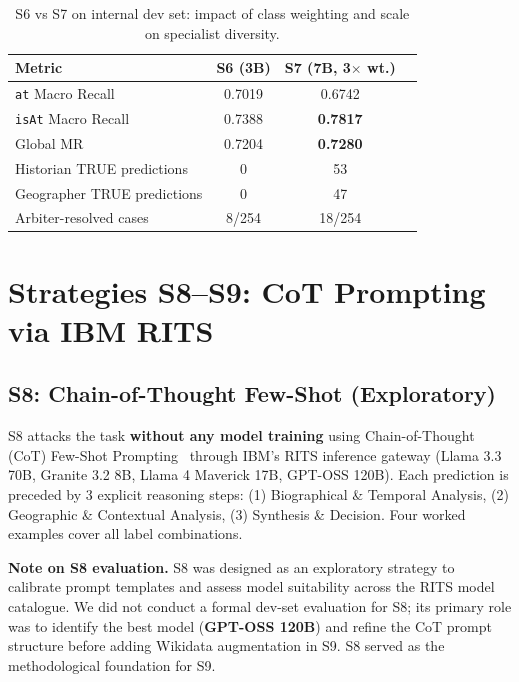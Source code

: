 \documentclass{ceurart}
\begin{document}
\begin{table}[ht]
  \caption{S6 vs S7 on internal dev set: impact of class weighting and scale on specialist diversity.}
  \label{tab:s7}
  \centering
  \begin{tabular}{lccc}
    \toprule
    \textbf{Metric} & \textbf{S6 (3B)} & \textbf{S7 (7B, 3$\times$ wt.)} \\
    \midrule
    \texttt{at} Macro Recall & 0.7019 & 0.6742 \\
    \texttt{isAt} Macro Recall & 0.7388 & \textbf{0.7817} \\
    Global MR & 0.7204 & \textbf{0.7280} \\
    Historian TRUE predictions & 0 & 53 \\
    Geographer TRUE predictions & 0 & 47 \\
    Arbiter-resolved cases & 8/254 & 18/254 \\
    \bottomrule
  \end{tabular}
\end{table}

\section{Strategies S8--S9: CoT Prompting via IBM RITS}
\label{sec:s89}

\subsection{S8: Chain-of-Thought Few-Shot (Exploratory)}

S8 attacks the task \textbf{without any model training} using Chain-of-Thought (CoT) Few-Shot Prompting~\cite{wei2022cot} through IBM's RITS inference gateway (Llama 3.3 70B, Granite 3.2 8B, Llama 4 Maverick 17B, GPT-OSS 120B). Each prediction is preceded by 3 explicit reasoning steps: (1) Biographical \& Temporal Analysis, (2) Geographic \& Contextual Analysis, (3) Synthesis \& Decision. Four worked examples cover all label combinations.

\textbf{Note on S8 evaluation.} S8 was designed as an exploratory strategy to calibrate prompt templates and assess model suitability across the RITS model catalogue. We did not conduct a formal dev-set evaluation for S8; its primary role was to identify the best model (\textbf{GPT-OSS 120B}) and refine the CoT prompt structure before adding Wikidata augmentation in S9. S8 served as the methodological foundation for S9.
\end{document}
